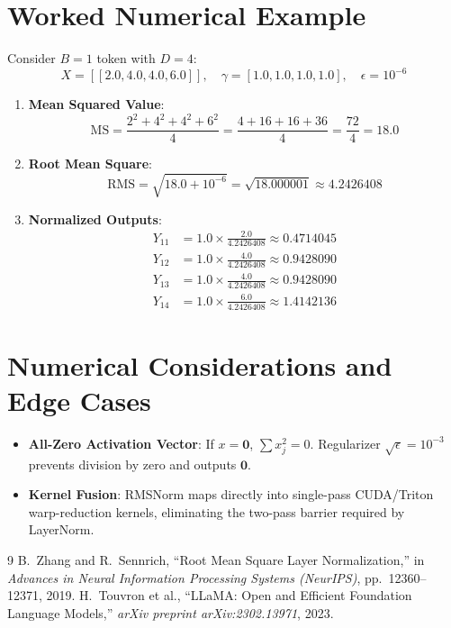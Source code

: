\documentclass[11pt,a4paper]{article}
\theoremstyle{definition}
\begin{document}
\section{Worked Numerical Example}

Consider $B = 1$ token with $D = 4$:
\begin{equation}
X = [[2.0, 4.0, 4.0, 6.0]], \quad \gamma = [1.0, 1.0, 1.0, 1.0], \quad \epsilon = 10^{-6}
\end{equation}

\begin{enumerate}
    \item \textbf{Mean Squared Value}:
    \begin{equation}
    \text{MS} = \frac{2^2 + 4^2 + 4^2 + 6^2}{4} = \frac{4 + 16 + 16 + 36}{4} = \frac{72}{4} = 18.0
    \end{equation}
    \item \textbf{Root Mean Square}:
    \begin{equation}
    \text{RMS} = \sqrt{18.0 + 10^{-6}} = \sqrt{18.000001} \approx 4.2426408
    \end{equation}
    \item \textbf{Normalized Outputs}:
    \begin{align}
    Y_{11} &= 1.0 \times \frac{2.0}{4.2426408} \approx 0.4714045 \\
    Y_{12} &= 1.0 \times \frac{4.0}{4.2426408} \approx 0.9428090 \\
    Y_{13} &= 1.0 \times \frac{4.0}{4.2426408} \approx 0.9428090 \\
    Y_{14} &= 1.0 \times \frac{6.0}{4.2426408} \approx 1.4142136
    \end{align}
\end{enumerate}

\section{Numerical Considerations and Edge Cases}

\begin{itemize}
    \item \textbf{All-Zero Activation Vector}: If $x = \mathbf{0}$, $\sum x_j^2 = 0$. Regularizer $\sqrt{\epsilon} = 10^{-3}$ prevents division by zero and outputs $\mathbf{0}$.
    \item \textbf{Kernel Fusion}: RMSNorm maps directly into single-pass CUDA/Triton warp-reduction kernels, eliminating the two-pass barrier required by LayerNorm.
\end{itemize}

\begin{thebibliography}{9}
 B.~Zhang and R.~Sennrich, ``Root Mean Square Layer Normalization,'' in \emph{Advances in Neural Information Processing Systems (NeurIPS)}, pp.~12360--12371, 2019.
 H.~Touvron et al., ``LLaMA: Open and Efficient Foundation Language Models,'' \emph{arXiv preprint arXiv:2302.13971}, 2023.
\end{thebibliography}
\end{document}
